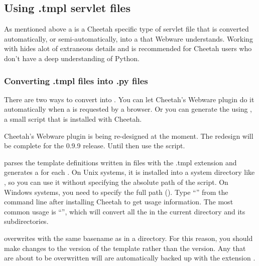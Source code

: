 \subsection{Using .tmpl servlet files}
\label{webware.tmpl}

As mentioned above a  is a Cheetah specific type of
servlet file that is converted automatically, or semi-automatically, into a
 that Webware understands.  Working with  hides alot of extraneous details and is recommended for Cheetah
users who don't have a deep understanding of Python.

\subsubsection{Converting .tmpl files into .py files}
\label{webware.tmpl.converting}

There are two ways to convert  into .  You can let Cheetah's Webware plugin do it automatically when a
 is requested by a browser. Or you can generate the
 using , a small script that is
installed with Cheetah.

Cheetah's Webware plugin is being re-designed at the moment.  The redesign will
be complete for the 0.9.9 release.  Until then use the 
script.

 parses the template definitions written in files with the
.tmpl extension and generates a  for each .  On Unix systems, it is installed into a system directory like
, so you can use it without specifying the absolute path of
the script.  On Windows systems, you need to specify the full path
(). Type ``'' from the
command line after installing Cheetah to get usage information.  The most common
usage is ``'', which will convert all the  in the current directory and its subdirectories.

 overwrites  with the same
basename as  in a directory. For this reason, you
should make changes to the  version of the template rather than the
 version.  Any  that are about to be
overwritten will are automatically backed up with the extension .


